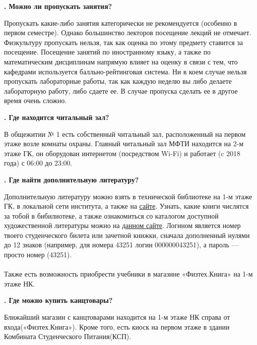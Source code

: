 \documentclass[14pt]{extarticle}
\newcounter{question}
\newcommand\Que[1]{%
    \begin{minipage}{\textwidth}
    \leavevmode\par
    \stepcounter{question}
    \noindent
    {\large\textbf{\thequestion. #1}}\par}
\newcommand\Ans[2][]{%
    \leavevmode\par\noindent
    {\leftskip37pt
    \textbf{#1}#2\par}
    \end{minipage}}
\begin{document}
\Que{Можно ли пропускать занятия?}
\Ans{Пропускать какие-либо занятия категорически не рекомендуется (особенно в первом семестре). Однако большинство лекторов посещение лекций не отмечает. Физкультуру пропускать нельзя, так как оценка по этому предмету ставится за посещение. Посещение занятий по иностранному языку, а также по математическим дисциплинам напрямую влияет на оценку в связи с тем, что кафедрами используется балльно-рейтинговая система. Ни в коем случае нельзя пропускать лабораторные работы, так как каждую неделю вы либо делаете лабораторную работу, либо сдаете ее. В случае пропуска сделать ее в другое время очень сложно.}

\Que{Где находится читальный зал?}
\Ans{В общежитии № 1 есть собственный читальный зал, расположенный на первом этаже возле комнаты охраны. Главный читальный зал МФТИ находится на 2-м этаже ГК, он оборудован интернетом (посредством Wi-Fi) и работает (c 2018 года) с 06:00 до 23:00.}

\Que{Где найти дополнительную литературу?}
\Ans{Дополнительную литературу можно взять в технической библиотеке на 1-м этаже ГК, в локальной сети института, а также на \href{http://lib.mipt.ru}{сайте}. Узнать, какие книги числятся за тобой в бибилиотеке, а также ознакомиться со каталогом доступной художественной литературы можно на \href{http://ruslanlib.phystech.edu/}{данном сайте}. Логином является номер твоего студенческого билета или зачетной книжки, сначала дополненный нулями до 12 знаков (например, для номера 43251 логин 000000043251), а пароль — просто номер (43251). \\ \\ Также есть возможность приобрести учебники в магазине «Физтех.Книга» на 1-м этаже НК.}

\Que{Где можно купить канцтовары?}
\Ans{Ближайший магазин с канцтоварами находится на 1-м этаже НК справа от входа(«Физтех.Книга»). Кроме того, есть киоск на первом этаже в здании Комбината Студенческого Питания(КСП).}
\end{document}
